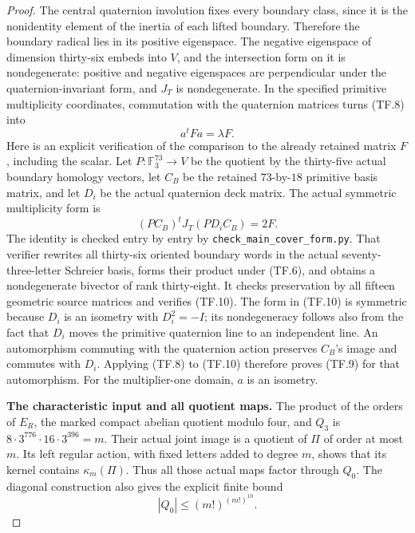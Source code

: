 \begin{proof}
The central quaternion involution fixes every boundary
class, since it is the nonidentity element of the inertia
of each lifted boundary. Therefore the boundary radical
lies in its positive eigenspace. The negative eigenspace
of dimension thirty-six embeds into \(V\), and the
intersection form on it is nondegenerate: positive and
negative eigenspaces are perpendicular under the
quaternion-invariant form, and \(J_T\) is nondegenerate.
In the specified primitive multiplicity coordinates,
commutation with the quaternion matrices turns (TF.8)
into
\[
                         a^t F a=\lambda F.
 \tag{TF.9}
\]
Here is an explicit verification of the comparison to the
already retained matrix \(F\), including the scalar.
Let \(P:\mathbb F_3^{73}\to V\) be the quotient by the
thirty-five actual boundary homology vectors, let \(C_B\)
be the retained \(73\)-by-\(18\) primitive basis matrix,
and let \(D_i\) be the actual quaternion deck matrix.
The actual symmetric multiplicity form is
\[
             (PC_B)^tJ_T(PD_iC_B)=2F.
 \tag{TF.10}
\]
The identity is checked entry by entry by
\texttt{check\_main\_cover\_form.py}. That verifier rewrites
all thirty-six oriented boundary words in the actual
seventy-three-letter Schreier basis, forms their product
under (TF.6), and obtains a nondegenerate bivector of
rank thirty-eight. It checks preservation by all fifteen
geometric source matrices and verifies (TF.10).
The form in (TF.10) is symmetric because \(D_i\) is an
isometry with \(D_i^2=-I\); its nondegeneracy follows
also from the fact that \(D_i\) moves the primitive
quaternion line to an independent line. An automorphism
commuting with the quaternion action preserves \(C_B\)'s
image and commutes with \(D_i\). Applying (TF.8) to
(TF.10) therefore proves (TF.9) for that automorphism.
For the multiplier-one domain, \(a\) is an isometry.

\par\medskip\noindent\textbf{The characteristic input and all quotient maps.}\quad
The product of the orders of \(E_R\), the marked compact
abelian quotient modulo four, and \(Q_3\) is
\(8\cdot3^{776}\cdot16\cdot3^{396}=m\).
Their actual joint image is a quotient of \(\Pi\) of
order at most \(m\). Its left regular action, with fixed
letters added to degree \(m\), shows that its kernel
contains \(\kappa_m(\Pi)\). Thus all those actual maps
factor through \(Q_0\). The diagonal construction also
gives the explicit finite bound
\[
                       |Q_0|\le(m!)^{(m!)^{10}}.
 \tag{TF.11}
\]


\end{proof}
